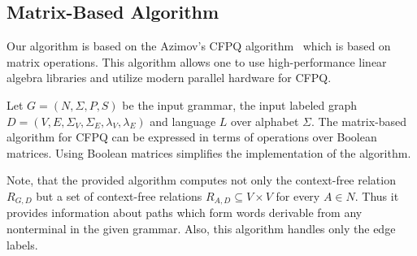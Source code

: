 \subsection{Matrix-Based Algorithm}
Our algorithm is based on the Azimov's CFPQ algorithm~\cite{Azimov:2018:CPQ:3210259.3210264} which is based on matrix operations.
This algorithm allows one to use high-performance linear algebra libraries and utilize modern parallel hardware for CFPQ.

Let $G = (N, \Sigma, P, S)$ be the input grammar, the input labeled graph $D = (V, E, \Sigma_V, \Sigma_E, \lambda_V, \lambda_E)$ and language $L$ over alphabet $\Sigma$.
The matrix-based algorithm for CFPQ can be expressed in terms of operations over Boolean matrices.
Using Boolean matrices simplifies the implementation of the algorithm.

%

Note, that the provided algorithm computes not only the context-free relation $R_{G,D}$ but a set of context-free relations $R_{A,D} \subseteq V \times V$ for every $A \in N$.
Thus it provides information about paths which form words derivable from any nonterminal in the given grammar.
Also, this algorithm handles only the edge labels.

